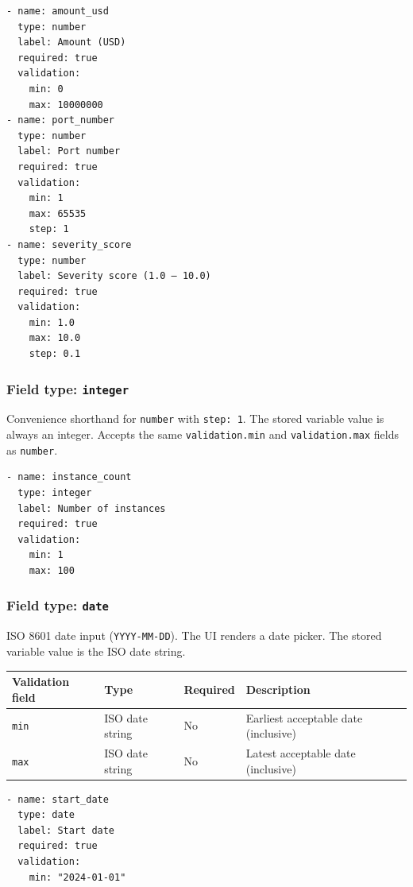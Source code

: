 \begin{verbatim}
- name: amount_usd
  type: number
  label: Amount (USD)
  required: true
  validation:
    min: 0
    max: 10000000
- name: port_number
  type: number
  label: Port number
  required: true
  validation:
    min: 1
    max: 65535
    step: 1
- name: severity_score
  type: number
  label: Severity score (1.0 – 10.0)
  required: true
  validation:
    min: 1.0
    max: 10.0
    step: 0.1
\end{verbatim}

\subsubsection{Field type: \texttt{integer}}
\label{subsubsec:field-integer}

Convenience shorthand for \texttt{number} with \texttt{step: 1}.  The stored
variable value is always an integer.  Accepts the same \texttt{validation.min}
and \texttt{validation.max} fields as \texttt{number}.

\begin{verbatim}
- name: instance_count
  type: integer
  label: Number of instances
  required: true
  validation:
    min: 1
    max: 100
\end{verbatim}

\subsubsection{Field type: \texttt{date}}
\label{subsubsec:field-date}

ISO 8601 date input (\texttt{YYYY-MM-DD}).  The UI renders a date picker.
The stored variable value is the ISO date string.

\begin{center}
\begin{tabular}{lllp{5cm}}
\hline
\textbf{Validation field} & \textbf{Type} & \textbf{Required} & \textbf{Description} \\
\hline
\texttt{min} & ISO date string & No & Earliest acceptable date (inclusive) \\
\texttt{max} & ISO date string & No & Latest acceptable date (inclusive) \\
\hline
\end{tabular}
\end{center}

\begin{verbatim}
- name: start_date
  type: date
  label: Start date
  required: true
  validation:
    min: "2024-01-01"
\end{verbatim}

